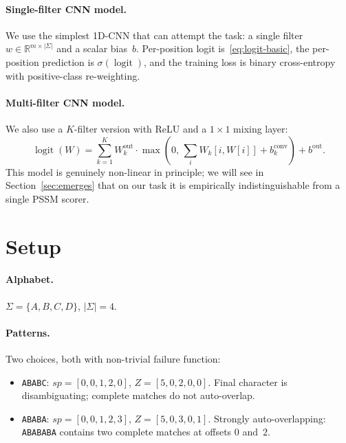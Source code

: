 \documentclass[11pt,a4paper]{article}
\newcommand{\sigmaalph}{\Sigma}
\begin{document}
\paragraph{Single-filter CNN model.}
We use the simplest 1D-CNN that can attempt the task: a single filter
$w \in \mathbb{R}^{m \times |\sigmaalph|}$ and a scalar bias~$b$.
Per-position logit is~\eqref{eq:logit-basic}, the per-position
prediction is $\sigma(\operatorname{logit})$, and the training loss is
binary cross-entropy with positive-class re-weighting.

\paragraph{Multi-filter CNN model.}
We also use a $K$-filter version with ReLU and a $1{\times}1$ mixing
layer:
\begin{equation}
\operatorname{logit}(W) = \sum_{k=1}^{K} W^{\text{out}}_k \cdot
\max\!\left(0,\, \textstyle\sum_{i} W_k[i, W[i]] + b^{\text{conv}}_k\right) +
b^{\text{out}}.
\label{eq:multi}
\end{equation}
This model is genuinely non-linear in principle; we will see in
Section~\ref{sec:emerges} that on our task it is empirically
indistinguishable from a single PSSM scorer.

\section{Setup}
\label{sec:setup}

\paragraph{Alphabet.} $\sigmaalph = \{A, B, C, D\}$, $|\sigmaalph| = 4$.

\paragraph{Patterns.}
Two choices, both with non-trivial failure function:
\begin{itemize}
\item \texttt{ABABC}: $sp = [0,0,1,2,0]$, $Z = [5,0,2,0,0]$. Final
  character is disambiguating; complete matches do not auto-overlap.
\item \texttt{ABABA}: $sp = [0,0,1,2,3]$, $Z = [5,0,3,0,1]$. Strongly
  auto-overlapping: \texttt{ABABABA} contains two complete matches at
  offsets $0$ and~$2$.
\end{itemize}
\end{document}
